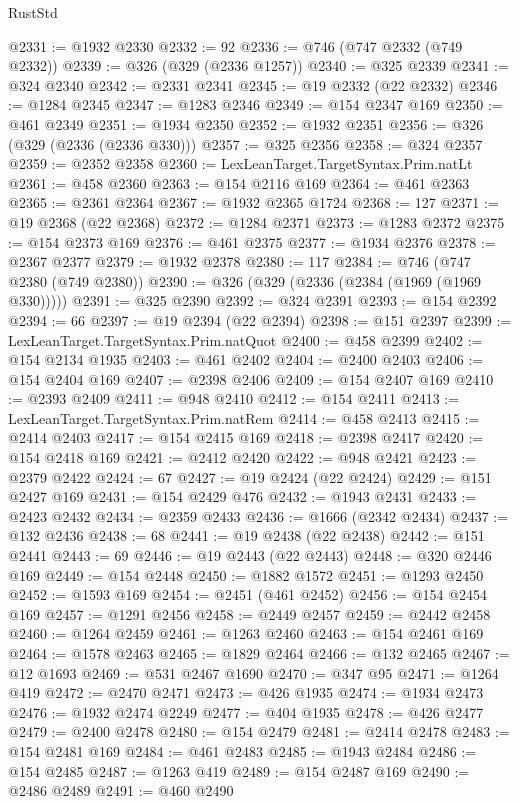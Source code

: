 \begin{lexlean}{RustStd}
\begin{coremodule}
{\begin{coremodule}
{{{{{{{{{{{{{{{{{{{{{{{{{{{{{{{{{{{{{{{{{{{{{{{{{{{{{{{{{{{{{{{{{{{{{{{{{{{{{{{{@2331 := @1932 @2330
@2332 := 92
@2336 := @746 (@747 @2332 (@749 @2332))
@2339 := @326 (@329 (@2336 @1257))
@2340 := @325 @2339
@2341 := @324 @2340
@2342 := @2331 @2341
@2345 := @19 @2332 (@22 @2332)
@2346 := @1284 @2345
@2347 := @1283 @2346
@2349 := @154 @2347 @169
@2350 := @461 @2349
@2351 := @1934 @2350
@2352 := @1932 @2351
@2356 := @326 (@329 (@2336 (@2336 @330)))
@2357 := @325 @2356
@2358 := @324 @2357
@2359 := @2352 @2358
@2360 := LexLeanTarget.TargetSyntax.Prim.natLt
@2361 := @458 @2360
@2363 := @154 @2116 @169
@2364 := @461 @2363
@2365 := @2361 @2364
@2367 := @1932 @2365 @1724
@2368 := 127
@2371 := @19 @2368 (@22 @2368)
@2372 := @1284 @2371
@2373 := @1283 @2372
@2375 := @154 @2373 @169
@2376 := @461 @2375
@2377 := @1934 @2376
@2378 := @2367 @2377
@2379 := @1932 @2378
@2380 := 117
@2384 := @746 (@747 @2380 (@749 @2380))
@2390 := @326 (@329 (@2336 (@2384 (@1969 (@1969 @330)))))
@2391 := @325 @2390
@2392 := @324 @2391
@2393 := @154 @2392
@2394 := 66
@2397 := @19 @2394 (@22 @2394)
@2398 := @151 @2397
@2399 := LexLeanTarget.TargetSyntax.Prim.natQuot
@2400 := @458 @2399
@2402 := @154 @2134 @1935
@2403 := @461 @2402
@2404 := @2400 @2403
@2406 := @154 @2404 @169
@2407 := @2398 @2406
@2409 := @154 @2407 @169
@2410 := @2393 @2409
@2411 := @948 @2410
@2412 := @154 @2411
@2413 := LexLeanTarget.TargetSyntax.Prim.natRem
@2414 := @458 @2413
@2415 := @2414 @2403
@2417 := @154 @2415 @169
@2418 := @2398 @2417
@2420 := @154 @2418 @169
@2421 := @2412 @2420
@2422 := @948 @2421
@2423 := @2379 @2422
@2424 := 67
@2427 := @19 @2424 (@22 @2424)
@2429 := @151 @2427 @169
@2431 := @154 @2429 @476
@2432 := @1943 @2431
@2433 := @2423 @2432
@2434 := @2359 @2433
@2436 := @1666 (@2342 @2434)
@2437 := @132 @2436
@2438 := 68
@2441 := @19 @2438 (@22 @2438)
@2442 := @151 @2441
@2443 := 69
@2446 := @19 @2443 (@22 @2443)
@2448 := @320 @2446 @169
@2449 := @154 @2448
@2450 := @1882 @1572
@2451 := @1293 @2450
@2452 := @1593 @169
@2454 := @2451 (@461 @2452)
@2456 := @154 @2454 @169
@2457 := @1291 @2456
@2458 := @2449 @2457
@2459 := @2442 @2458
@2460 := @1264 @2459
@2461 := @1263 @2460
@2463 := @154 @2461 @169
@2464 := @1578 @2463
@2465 := @1829 @2464
@2466 := @132 @2465
@2467 := @12 @1693
@2469 := @531 @2467 @1690
@2470 := @347 @95
@2471 := @1264 @419
@2472 := @2470 @2471
@2473 := @426 @1935
@2474 := @1934 @2473
@2476 := @1932 @2474 @2249
@2477 := @404 @1935
@2478 := @426 @2477
@2479 := @2400 @2478
@2480 := @154 @2479
@2481 := @2414 @2478
@2483 := @154 @2481 @169
@2484 := @461 @2483
@2485 := @1943 @2484
@2486 := @154 @2485
@2487 := @1263 @419
@2489 := @154 @2487 @169
@2490 := @2486 @2489
@2491 := @460 @2490
}}}}}}}}}}}}}}}}}}}}}}}}}}}}}}}}}}}}}}}}}}}}}}}}}}}}}}}}}}}}}}}}}}}}}}}}}}}}}}}}
\end{coremodule}}
\end{coremodule}
\end{lexlean}
